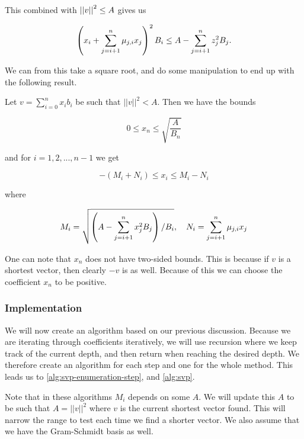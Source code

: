   This combined with $\left|\left| v \right|\right|^2 \leq A$ gives us

  \begin{equation}
    \left(  x_i + \sum_{j=i+1}^{n} \mu_{j,i} x_j  \right)^2 B_i \leq A - \sum_{j=i+1}^{n} z_j^2 B_j. 
    \label{eq:bounds-i}
  \end{equation}
  
  We can from this take a square root, and do some manipulation to end up with the following result.

  \begin{theorem}
    Let $v = \sum_{i=0}^{n} x_i b_i$ be such that $||v||^2 < A$.
    Then we have the bounds

    \begin{equation}
      \label{eq:n-bounds}
      0 \leq x_n \leq \sqrt{\frac{A}{B_n}}
    \end{equation}

    and for $i = 1,2,...,n-1$ we get

    \begin{equation}
      \label{eq:i-bounds}
      -(M_i + N_i) \leq x_i \leq M_i - N_i
    \end{equation}

    where

    \begin{equation}
      M_i = \sqrt{ \left(  A - \sum_{j=i+1}^{n} x_j^2 B_j  \right) / B_i }, \quad
      N_i = \sum_{j=i+1}^{n} \mu_{j,i} x_j
    \end{equation}
    
  \end{theorem}
  
  One can note that $x_n$ does not have two-sided bounds.
  This is because if $v$ is a shortest vector, then clearly $-v$ is as well.
  Because of this we can choose the coefficient $x_n$ to be positive.


\subsubsection{Implementation}

  We will now create an algorithm based on our previous discussion.
  Because we are iterating through coefficients iteratively, we will use recursion where we keep track of the current depth, and then return when reaching the desired depth.
  We therefore create an algorithm for each step and one for the whole method.
  This leads us to \cref{alg:svp-enumeration-step}, and \cref{alg:svp}.

  Note that in these algorithms $M_i$ depends on some $A$.
  We will update this $A$ to be such that $A = ||v||^2$ where $v$ is the current shortest vector found.
  This will narrow the range to test each time we find a shorter vector.
  We also assume that we have the Gram-Schmidt basis as well.

